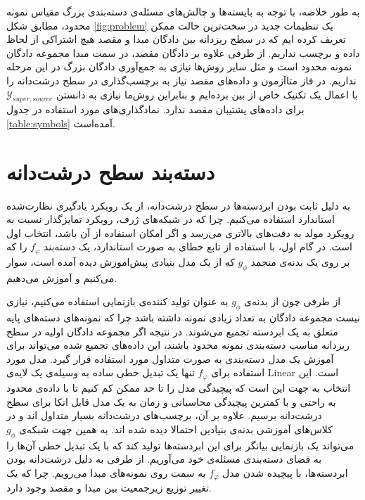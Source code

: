   به طور خلاصه، با توجه به بایسته‌ها و چالش‌های مسئله‌ی دسته‌بندی بزرگ مقیاس نمونه محدود، مطابق شکل 
  \ref{fig:problem}
  یک تنظیمات جدید در سخت‌ترین حالت ممکن تعریف کرده ایم که در سطح ریزدانه بین دادگان مبدا و مقصد هیچ اشتراکی از لحاظ داده و برچسب نداریم. از طرفی علاوه بر دادگان مقصد، در سمت مبدا مجموعه دادگان نمونه محدود است و مثل سایر روش‌ها نیازی به جمع‌آوری دادگان بزرگ در این مرحله نداریم. در فاز متاآزمون و داده‌های مقصد نیاز به برچسب‌گذاری در سطح درشت‌دانه را با اعمال یک تکنیک خاص از بین برده‌ایم و بنابراین روش‌ما نیازی به دانستن 
$\mathcal{Y}_{super, source}$
 برای داده‌های پشتیبان مقصد ندارد. نمادگذاری‌های مورد استفاده در جدول 
 \ref{table:symbols}
 آمده‌است.
 
 \section{دسته‌بند سطح درشت‌دانه} \label{sec:coarseMethod}
 
 به دلیل ثابت بودن ابردسته‌ها در سطح درشت‌دانه، از یک رویکرد یادگیری نظارت‌شده استاندارد استفاده می‌کنیم. چرا که در شبکه‌های ژرف، رویکرد تمایزگذار نسبت به رویکرد مولد به دقت‌های بالاتری می‌رسد و اگر امکان استفاده از آن باشد، انتخاب اول است. در گام اول، با استفاده از تابع خطای 
 به صورت استاندارد، یک دسته‌بند 
 $f_{\varphi}$
 را که بر روی یک بدنه‌ی منجمد 
 $g_{\phi}$
 که از یک مدل بنیادی پیش‌اموزش دیده آمده است، سوار می‌کنیم و آموزش می‌دهیم.
 
 از طرفی چون از بدنه‌ی 
 $g_{\phi}$
 به عنوان تولید کننده‌ی بازنمایی استفاده می‌کنیم، نیازی نیست مجموعه دادگان به تعداد زیادی نمونه داشته باشد چرا که نمونه‌های دسته‌های پایه متعلق به یک ابردسته تجمیع می‌شوند. در نتیجه اگر مجموعه دادگان اولیه در سطح ریزدانه مناسب دسته‌بندی نمونه محدود باشند، این داده‌های تجمیع شده می‌تواند برای آموزش یک مدل دسته‌بندی به صورت متداول مورد استفاده قرار گیرد. مدل مورد استفاده برای 
   $f_{\varphi}$
   تنها یک تبدیل خطی ساده به وسیله‌ی یک لایه‌ی Linear است. این انتخاب به جهت این است که پیچیدگی مدل را تا حد ممکن کم کنیم تا با داده‌ی محدود به راحتی و با کمترین پیچیدگی محاسباتی و زمان به یک مدل قابل اتکا برای سطح درشت‌دانه برسیم. علاوه بر آن، برچسب‌های درشت‌دانه بسیار متداول اند و در کلاس‌های آموزشی بدنه‌ی بنیادین احتمالا دیده شده اند. به همین جهت شبکه‌ی 
    $g_{\phi}$
    می‌تواند یک بازنمایی بیانگر برای این ابردسته‌ها تولید کند که با یک تبدیل خطی آن‌ها را به فضای دسته‌بندی مسئله‌ی خود می‌آوریم.
    از طرفی به دلیل درشت‌دانه بودن ابردسته‌ها، با پیچیده شدن مدل 
    $f_{\varphi}$
    به سمت 
    روی نمونه‌های مبدا می‌رویم. چرا که یک تغییر توزیع زیرجمعیت بین مبدا و مقصد وجود دارد.
    
